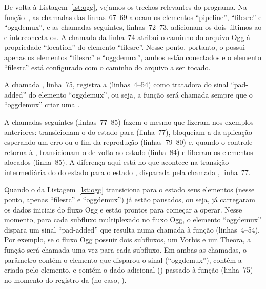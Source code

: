 \documentclass{SBCbookchapter}
\begin{document}
De volta à Listagem~\ref{lst:ogg}, vejamos os trechos relevantes do
programa.  Na função~, as chamadas das linhas~67--69 alocam os
elementos ``pipeline'', ``filesrc'' e ``oggdemux'', e as chamadas seguintes,
linhas~72--73, adicionam os dois últimos ao  e interconecta-os.
A chamada da linha~74 atribui o caminho do arquivo Ogg à propriedade
``location'' do elemento ``filesrc''.  Nesse ponto, portanto, o
 possui apenas os elementos ``filesrc'' e ``oggdemux'', ambos
estão conectados e o elemento ``filesrc'' está configurado com o caminho do
arquivo a ser tocado.

A chamada , linha~75, registra a 
 (linhas~4--54) como tratadora do sinal ``pad-added'' do
elemento ``oggdemux'', ou seja, a função  será chamada
sempre que o ``oggdemux'' criar uma .

A chamadas seguintes (linhas~77--85) fazem o mesmo que fizeram nos exemplos
anteriores: transicionam o  do estado  para
 (linha~77), bloqueiam a  da aplicação esperando um
erro ou o fim da reprodução (linhas~79--80) e, quando o controle retorna à
, transicionam o  de volta ao estado 
(linha~84) e liberam os elementos alocados (linha~85).  A diferença aqui
está no que acontece na transição intermediária do  do estado
 para o estado , disparada pela chamada
, linha~77.

Quando o  da Listagem~\ref{lst:ogg} transiciona para o estado
 seus elementos (nesse ponto, apenas ``filesrc'' e ``oggdemux'') já
estão pausados, ou seja, já carregaram os dados iniciais do fluxo Ogg e
estão prontos para começar a operar.  Nesse momento, para cada subfluxo
multiplexado no fluxo Ogg, o elemento ``oggdemux'' dispara um sinal
``pad-added'' que resulta numa chamada à função 
(linhas~4--54).  Por exemplo, se o fluxo Ogg possuir dois subfluxos, um
Vorbis e um Theora, a função  será chamada uma vez para cada
subfluxo.  Em ambas as chamadas, o parâmetro  contém o elemento que
disparou o sinal (``oggdemux''),  contém a 
criada pelo elemento, e  contém o dado adicional ()
passado à função  (linha~75) no momento do registro da
 (no caso, ).
\end{document}

